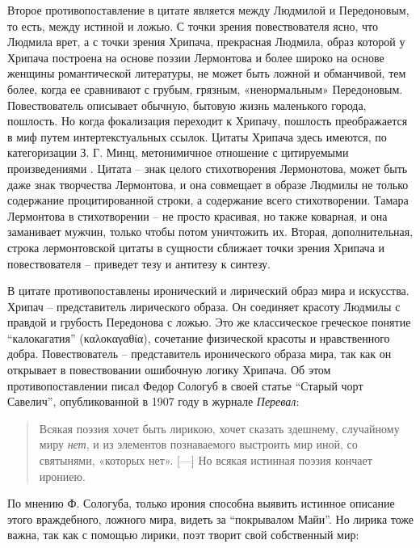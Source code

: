 \documentclass[12pt,a4paper]{article}
\begin{document}
Второе противопоставление в цитате является между Людмилой и Передоновым, то есть, между истиной и ложью. С точки зрения повествователя ясно, что Людмила врет, а с точки зрения Хрипача, прекрасная Людмила, образ которой у Хрипача построена на основе поэзии Лермонтова и более широко на основе женщины романтической литературы, не может быть ложной и обманчивой, тем более, когда ее сравнивают с грубым, грязным, «ненормальным» Передоновым. Повествователь описывает обычную, бытовую жизнь маленького города, пошлость. Но когда фокализация переходит к Хрипачу, пошлость преображается в миф путем интертекстуальных ссылок. Цитаты Хрипача здесь имеются, по категоризации З. Г. Минц, метонимичное отношение с цитируемыми произведениями \parencite[396]{mints1973}. Цитата – знак целого стихотворения Лермонотова, может быть даже знак творчества Лермонтова, и она совмещает в образе Людмилы не только содержание процитированной строки, а содержание всего стихотворении. Тамара Лермонтова в стихотворении – не просто красивая, но также коварная, и она заманивает мужчин, только чтобы потом уничтожить их. Вторая, дополнительная, строка лермонтовской цитаты в сущности сближает точки зрения Хрипача и повествователя – приведет тезу и антитезу к синтезу.


В цитате противопоставлены иронический и лирический образ мира и искусства. Хрипач – представитель лирического образа. Он соединяет красоту Людмилы с правдой и грубость Передонова с ложью. Это же классическое греческое понятие \enquote{калокагатия} (\foreignlanguage{greek}{καλοκαγαθία}), сочетание физической красоты и нравственного добра.  Повествователь – представитель иронического образа мира, так как он открывает в повествовании ошибочную логику Хрипача. Об этом противопоставлении писал Федор Сологуб в своей статье \enquote{Старый чорт Савелич}, опубликованной в 1907 году в журнале \emph{Перевал}:


\begin{quote}
Всякая поэзия хочет быть лирикою, хочет сказать здешнему,
случайному миру \textit{нет}, и из элементов познаваемого выстроить
мир иной, со святынями, «которых нет».
[---]
Но всякая истинная поэзия кончает ирониею.

\parencite[164.]{sologub1991}
\end{quote}

По мнению Ф. Сологуба, только ирония способна выявить истинное описание этого враждебного, ложного мира, видеть за \enquote{покрывалом Майи}. Но лирика тоже важна, так как с помощью лирики, поэт творит свой собственный мир:
\end{document}
